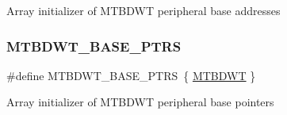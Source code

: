 Array initializer of M\+T\+B\+D\+WT peripheral base addresses \mbox{\label{group___m_t_b_d_w_t___peripheral___access___layer_ga0cbd89263cdbe0c07c59ed21112ea9ad}} 
\subsubsection{\texorpdfstring{MTBDWT\_BASE\_PTRS}{MTBDWT\_BASE\_PTRS}}
{\footnotesize\ttfamily \#define M\+T\+B\+D\+W\+T\+\_\+\+B\+A\+S\+E\+\_\+\+P\+T\+RS~\{ \mbox{\hyperlink{group___m_t_b_d_w_t___peripheral___access___layer_ga9727da650f73f6eee83b3886f78b8b7a}{M\+T\+B\+D\+WT}} \}}

Array initializer of M\+T\+B\+D\+WT peripheral base pointers 